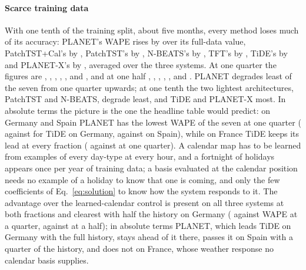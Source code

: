\paragraph{Scarce training data} With one tenth of the training split, about five months,
every method loses much of its accuracy: PLANET's WAPE rises by
 over its full-data value, PatchTST+Cal's by
, PatchTST's by
, N-BEATS's by
, TFT's by
, TiDE's by 
and PLANET-X's by , averaged over the three
systems. At one quarter the figures are ,
, ,
, ,
 and ,
and at one half ,
, ,
, ,
 and .
PLANET degrades least of the seven from one quarter upwards; at one tenth the two lightest
architectures, PatchTST and N-BEATS, degrade least, and TiDE and PLANET-X most. In absolute
terms the picture is the one the headline table would predict: on Germany and Spain PLANET
has the lowest WAPE of the seven at one quarter (
against  for TiDE on Germany,
 against  on
Spain), while on France TiDE keeps its lead at every fraction
( against 
at one quarter). A calendar map has to be learned from examples of every day-type at every
hour, and a fortnight of holidays appears once per year of training data; a basis evaluated
at the calendar position needs no example of a holiday to know that one is coming, and only
the few coefficients of Eq.~\eqref{eq:solution} to know how the system responds to it. The advantage over the learned-calendar control is present on all three systems at both
fractions and clearest with half the history on Germany
( against 
WAPE at a quarter,  against
 at a half); in absolute terms PLANET, which leads TiDE
on Germany with the full history, stays ahead of it there, passes it on Spain with a quarter
of the history, and does not on France, whose weather response no calendar basis supplies.

